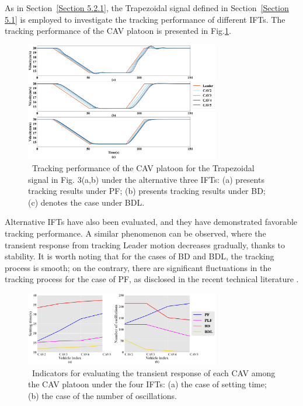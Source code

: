 \documentclass[journal]{IEEEtran}
\begin{document}
As in Section~\ref{Section 5.2.1}, the Trapezoidal signal defined in Section~\ref{Section 5.1} is employed to investigate the tracking performance of different IFTs. The tracking performance of the CAV platoon is presented in Fig.\ref{fig9}.


\begin{figure}

  \centering
  \includegraphics[width=8.5cm]{figs/fig9.png}
  \caption{~Tracking performance of the CAV platoon for the Trapezoidal signal in Fig. 3(a,b) under the alternative three IFTs: (a) presents tracking results under PF; (b) presents tracking results under BD; (c) denotes the case under BDL.}
  \label{fig9}
\end{figure}


Alternative IFTs have also been evaluated, and they have demonstrated favorable tracking performance. A similar phenomenon can be observed, where the transient response from tracking Leader motion decreases gradually, thanks to stability. It is worth noting that for the cases of BD and BDL, the tracking process is smooth; on the contrary, there are significant fluctuations in the tracking process for the case of PF, as disclosed in the recent technical literature \citep{Zheng2015}.

\begin{figure}

  \centering
  \includegraphics[width=8.5cm]{figs/fig10.png}
  \caption{~Indicators for evaluating the transient response of each CAV among the CAV platoon under the four IFTs: (a) the case of setting time; (b) the case of the number of oscillations.}
  \label{fig10}
\end{figure}
\end{document}
